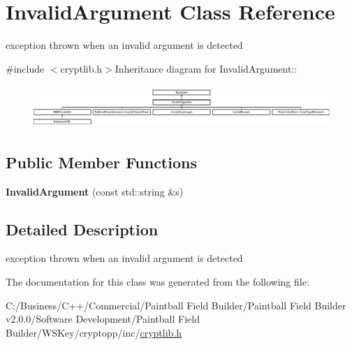 \hypertarget{class_invalid_argument}{
\section{InvalidArgument Class Reference}
\label{class_invalid_argument}
}


exception thrown when an invalid argument is detected  


{\ttfamily \#include $<$cryptlib.h$>$}Inheritance diagram for InvalidArgument::\begin{figure}[H]
\begin{center}
\leavevmode
\includegraphics[height=1.62909cm]{class_invalid_argument}
\end{center}
\end{figure}
\subsection*{Public Member Functions}
\begin{DoxyCompactItemize}
\item 
\hypertarget{class_invalid_argument_a9fea12aad2d0a973c7a3f109202642ff}{
{\bfseries InvalidArgument} (const std::string \&s)}
\label{class_invalid_argument_a9fea12aad2d0a973c7a3f109202642ff}

\end{DoxyCompactItemize}


\subsection{Detailed Description}
exception thrown when an invalid argument is detected 

The documentation for this class was generated from the following file:\begin{DoxyCompactItemize}
\item 
C:/Business/C++/Commercial/Paintball Field Builder/Paintball Field Builder v2.0.0/Software Development/Paintball Field Builder/WSKey/cryptopp/inc/\hyperlink{cryptlib_8h}{cryptlib.h}\end{DoxyCompactItemize}
